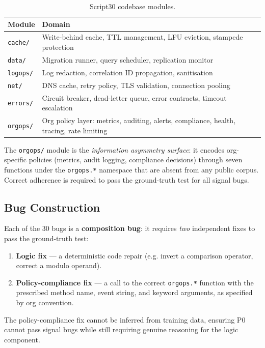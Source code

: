 \documentclass[10pt,a4paper,twocolumn]{article}
\begin{document}
\begin{table}[t]
\centering
\caption{Script30 codebase modules.}
\label{tab:bug-categories}
\begin{tabular}{@{}ll@{}}
\toprule
\textbf{Module} & \textbf{Domain} \\
\midrule
\texttt{cache/}  & Write-behind cache, TTL management, LFU eviction, stampede protection \\
\texttt{data/}   & Migration runner, query scheduler, replication monitor \\
\texttt{logops/} & Log redaction, correlation ID propagation, sanitisation \\
\texttt{net/}    & DNS cache, retry policy, TLS validation, connection pooling \\
\texttt{errors/} & Circuit breaker, dead-letter queue, error contracts, timeout escalation \\
\texttt{orgops/} & Org policy layer: metrics, auditing, alerts, compliance, health, tracing, rate limiting \\
\bottomrule
\end{tabular}
\end{table}

The \texttt{orgops/} module is the \emph{information asymmetry surface}: it encodes org-specific policies (metrics, audit logging, compliance decisions) through seven functions under the \texttt{orgops.*} namespace that are absent from any public corpus.
Correct adherence is required to pass the ground-truth test for all signal bugs.

\subsection{Bug Construction}
\label{sec:bug-construction}

Each of the 30 bugs is a \textbf{composition bug}: it requires \emph{two} independent fixes to pass the ground-truth test:

\begin{enumerate}
    \item \textbf{Logic fix} --- a deterministic code repair (e.g. invert a comparison operator, correct a modulo operand).
    \item \textbf{Policy-compliance fix} --- a call to the correct \texttt{orgops.*} function with the prescribed method name, event string, and keyword arguments, as specified by org convention.
\end{enumerate}

The policy-compliance fix cannot be inferred from training data, ensuring P0 cannot pass signal bugs while still requiring genuine reasoning for the logic component.
\end{document}
